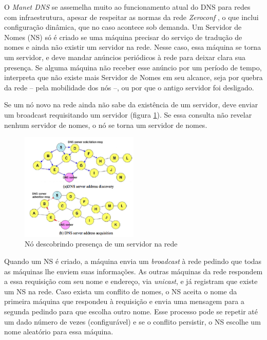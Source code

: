     O \textit{Manet DNS} se assemelha muito ao funcionamento atual do DNS para 
    redes com infraestrutura, apesar de respeitar as normas da rede \textit{Zeroconf}
    \cite{zeroconf}, o que inclui configuração dinâmica, que no caso acontece sob
    demanda. Um Servidor de Nomes (NS) só é criado se uma máquina precisar do 
    serviço de tradução de nomes e ainda não existir um servidor na rede. Nesse 
    caso, essa máquina se torna um servidor, e deve mandar anúncios periódicos à
    rede para deixar clara sua presença. Se alguma máquina não receber esse
    anúncio por um período de tempo, interpreta que não existe mais Servidor de 
    Nomes em seu alcance, seja por quebra da rede -- pela mobilidade dos nós --,
    ou por que o antigo servidor foi desligado.

    Se um nó novo na rede ainda não sabe da existência de um servidor, deve enviar
    um broadcast requisitando um servidor (figura \ref{centralized}). Se essa
    consulta não revelar nenhum servidor de nomes, o nó se torna um servidor de
    nomes.
    
    \begin{figure}[h!]
        \centering
        \includegraphics[width=0.5\textwidth]{figures/centralized}
        \caption{Nó descobrindo presença de um servidor na rede}
        \label{centralized}
    \end{figure}

    Quando um NS é criado, a máquina envia um 
    \textit{broadcast} à rede pedindo que todas as máquinas lhe enviem suas 
    informações. As outras máquinas da rede respondem a essa requisição com seu 
    nome e endereço, via \textit{unicast}, e já registram que existe um NS na rede.
    Caso exista um conflito de nomes, o NS aceita o nome da primeira máquina que
    respondeu à requisição e envia uma mensagem para a segunda pedindo
    para que escolha outro nome. Esse processo pode se repetir até um dado número
    de vezes (configurável) e se o conflito persistir, o NS escolhe um nome 
    aleatório para essa máquina.
  
